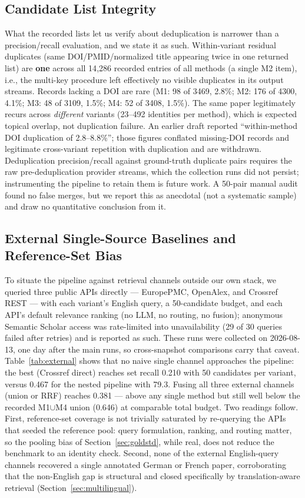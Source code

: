 \documentclass[sigconf,screen]{acmart}
\begin{document}
\subsection{Candidate List Integrity}
\label{sec:integrity}

What the recorded lists let us verify about deduplication is narrower
than a precision/recall evaluation, and we state it as such. Within-variant
residual duplicates (same DOI/PMID/normalized title appearing twice in one
returned list) are \textbf{one} across all 14{,}286 recorded entries of
all methods (a single M2 item), i.e., the multi-key procedure left
effectively no visible duplicates in its output streams. Records lacking a
DOI are rare (M1: 98 of 3469, 2.8\%; M2: 176 of 4300, 4.1\%; M3: 48 of
3109, 1.5\%; M4: 52 of 3408, 1.5\%). The same paper legitimately recurs
across \emph{different} variants (23--492 identities per method), which is
expected topical overlap, not duplication failure. An earlier
draft reported ``within-method DOI duplication of 2.8--8.8\%''; those
figures conflated missing-DOI records and legitimate cross-variant
repetition with duplication and are withdrawn. Deduplication
precision/recall against ground-truth duplicate pairs requires the raw
pre-deduplication provider streams, which the collection runs did not
persist; instrumenting the pipeline to retain them is future work. A
50-pair manual audit found no false merges, but we report this as
anecdotal (not a systematic sample) and draw no quantitative conclusion
from it.

\subsection{External Single-Source Baselines and Reference-Set Bias}
\label{sec:external}

To situate the pipeline against retrieval channels outside our own stack,
we queried three public APIs directly --- EuropePMC, OpenAlex, and
Crossref REST --- with each variant's English query, a 50-candidate
budget, and each API's default relevance ranking (no LLM, no routing, no
fusion); anonymous Semantic Scholar access was rate-limited into
unavailability (29 of 30 queries failed after retries) and is reported as
such. These runs were collected on 2026-08-13, one day after the main
runs, so cross-snapshot comparisons carry that caveat.
Table~\ref{tab:external} shows that no naive single channel approaches
the pipeline: the best (Crossref direct) reaches set recall 0.210 with 50
candidates per variant, versus 0.467 for the nested pipeline with 79.3.
Fusing all three external channels (union or RRF) reaches 0.381 --- above
any single method but still well below the recorded M1$\cup$M4 union
(0.646) at comparable total budget. Two readings follow. First,
reference-set coverage is not trivially saturated by re-querying the APIs
that seeded the reference pool: query formulation, ranking, and routing
matter, so the pooling bias of Section~\ref{sec:goldstd}, while real, does
not reduce the benchmark to an identity check. Second, none of the external
English-query channels recovered a single annotated German or French
paper, corroborating that the non-English gap is structural and closed
specifically by translation-aware retrieval
(Section~\ref{sec:multilingual}).
\end{document}
